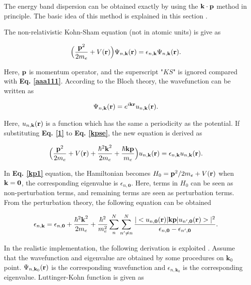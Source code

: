 \documentclass[a4paper, 12pt, titlepage,oneside,drop]{kthesis}
\begin{document}
The energy band dispersion can be obtained exactly by using the $\bold k \cdot \bold p$ method in principle. The basic idea of this method is explained in this section \cite{voon2009kp, kane1966k}.

The non-relativistic Kohn-Sham equation (not in atomic units) is give as

\begin{equation}\label{kpse}
\Big( \frac {{\textbf p}^2} {2m_e} + V({\textbf r}) \Big) \wfbloch<n>< \bold k> = \epsilon_{n,\textbf{k}} \wfbloch<n><\bold k>.
\end{equation}

Here, $\textbf p$ is momentum operator, and the superscript "$KS$" is ignored compared with \textbf{Eq. \ref{aaa111}}. According to the Bloch theory, the wavefunction can be written as

\begin{equation}\label{1}
 \wfbloch<n><\bold k> = \expg<k> \ubloch<n><\bold k>.
\end{equation}

Here, $\ubloch<n><\bold k>$ is a function which has the same a periodicity as the potential. If substituting \textbf{Eq. \ref{1}} to \textbf{Eq. \ref{kpse}}, the new equation is derived as

\begin{equation}\label{kp1}
 \Big(  \frac{{\textbf p}^2}{2m_e} + V({\textbf r }) + \frac{{\hbar^2 {\textbf k}^2}}{2m_e} + \frac{{\hbar \textbf {kp}}}{m_e} \Big) \ubloch<n><\bold  k>  =  \epsilon_{n,\textbf{k}} \ubloch<n><\bold  k>.
\end{equation}

In \textbf{Eq. \ref{kp1}} equation, the Hamiltonian becomes $H_0 = {\textbf p}^2 / {2m_e} + V({\textbf r })$ when $\textbf k = \textbf 0$, the corresponding eigenvalue is $\epsilon_{n,\textbf{0}}$. 
Here, terms in $H_0$ can be seen as non-perturbation terms, and remaining terms are seen as perturbation terms. From the perturbation theory, the following equation can be obtained  

\begin{equation}
 \epsilon_{n,\textbf{k}} =  \epsilon_{n,\textbf{0}} + \frac{{\hbar^2 {\textbf k}^2}}{2m_e} + \frac{ \hbar^2}{m_{e}^2} \sum\limits_n^{N} \sum\limits_{n' \neq n}^{N} \frac{|<\ubloch<n><\bold 0>|{\textbf {kp}}|\ubloch<n'><\bold  0>>|^2}{\epsilon_{n,\textbf 0} - \epsilon_{n',\textbf 0}}.
\end{equation}

In the realistic implementation, the following derivation is exploited \cite{persson2007full}. Assume that the wavefunction and eigenvalue are obtained by some procedures on $\textbf{k}_0$ point. $\wfbloch<n><\bold{k}_0>$ is the corresponding wavefunction
and $\epsilon_{n,\textbf{k}_0}$ is the corresponding eigenvalue. Luttinger-Kohn function is given as
\end{document}
